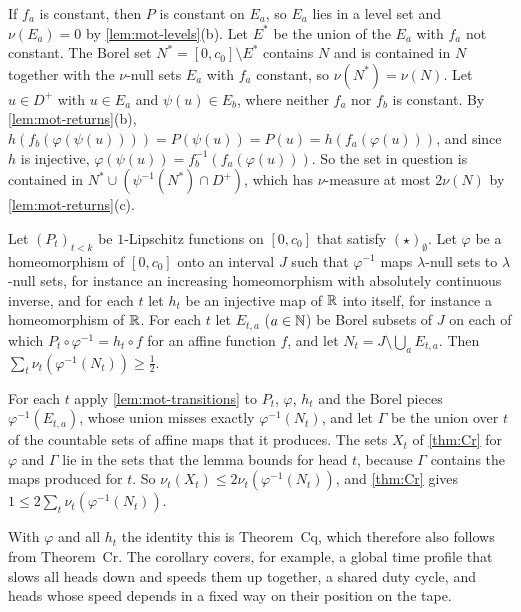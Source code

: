 \begin{informalproof}
If $f_a$ is constant, then $P$ is constant on $E_a$, so $E_a$ lies in a level set and $\nu(E_a)=0$ by
\cref{lem:mot-levels}(b). Let $E^*$ be the union of the $E_a$ with $f_a$ not constant. The Borel set
$N^*=[0,c_0]\setminus E^*$ contains $N$ and is contained in $N$ together with the $\nu$-null sets $E_a$ with $f_a$
constant, so $\nu(N^*)=\nu(N)$. Let $u\in D^+$ with $u\in E_a$ and $\psi(u)\in E_b$, where neither $f_a$ nor $f_b$ is
constant. By \cref{lem:mot-returns}(b), $h(f_b(\varphi(\psi(u))))=P(\psi(u))=P(u)=h(f_a(\varphi(u)))$, and since $h$ is
injective, $\varphi(\psi(u))=f_b^{-1}(f_a(\varphi(u)))$. So the set in question is contained in
$N^*\cup(\psi^{-1}(N^*)\cap D^+)$, which has $\nu$-measure at most $2\nu(N)$ by \cref{lem:mot-returns}(c).
\end{informalproof}

\begin{corollary}\label{cor:mot-clock}
\notformalized
Let $(P_t)_{t<k}$ be $1$-Lipschitz functions on $[0,c_0]$ that satisfy $(\star)_\emptyset$. Let $\varphi$ be a
homeomorphism of $[0,c_0]$ onto an interval $J$ such that $\varphi^{-1}$ maps $\lambda$-null sets to $\lambda$-null sets,
for instance an increasing homeomorphism with absolutely continuous inverse, and for each $t$ let $h_t$ be an injective
map of $\mathbb{R}$ into itself, for instance a homeomorphism of $\mathbb{R}$. For each $t$ let $E_{t,a}$ ($a\in\mathbb{N}$) be Borel subsets
of $J$ on each of which $P_t\circ\varphi^{-1}=h_t\circ f$ for an affine function $f$, and let
$N_t=J\setminus\bigcup_aE_{t,a}$. Then $\sum_t\nu_t(\varphi^{-1}(N_t))\ge\frac12$.
\end{corollary}

\begin{informalproof}
For each $t$ apply \cref{lem:mot-transitions} to $P_t$, $\varphi$, $h_t$ and the Borel pieces $\varphi^{-1}(E_{t,a})$,
whose union misses exactly $\varphi^{-1}(N_t)$, and let $\Gamma$ be the union over $t$ of the countable sets of affine
maps that it produces. The sets $X_t$ of \cref{thm:Cr} for $\varphi$ and $\Gamma$ lie in the sets that the lemma bounds
for head $t$, because $\Gamma$ contains the maps produced for $t$. So $\nu_t(X_t)\le2\nu_t(\varphi^{-1}(N_t))$, and
\cref{thm:Cr} gives $1\le2\sum_t\nu_t(\varphi^{-1}(N_t))$.
\end{informalproof}

With $\varphi$ and all $h_t$ the identity this is Theorem~Cq, which therefore also follows from Theorem~Cr. The corollary
covers, for example, a global time profile that slows all heads down and speeds them up together, a shared duty cycle,
and heads whose speed depends in a fixed way on their position on the tape.


